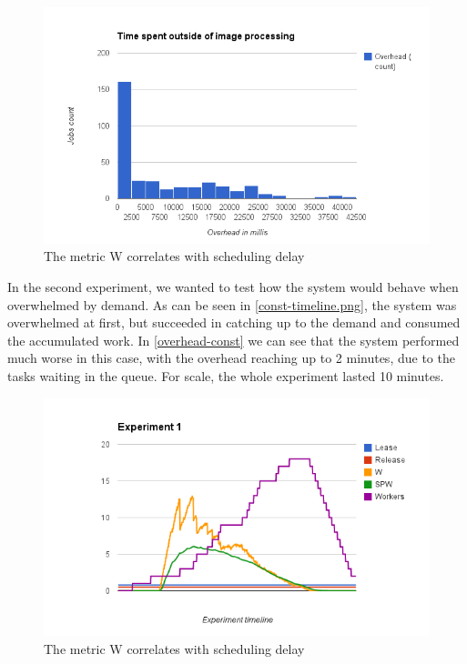 \documentclass{stylesheet}
\begin{document}
\begin{figure}[b!]
	\centering
	\includegraphics[width=\linewidth]{overhead-exp2.png}
	\caption{The metric W correlates with scheduling delay}
	\label{fig:scheduling-W}
\end{figure}

In the second experiment, we wanted to test how the system would behave when overwhelmed by demand. As can be seen in \cref{const-timeline.png}, the system was overwhelmed at first, but succeeded in catching up to the demand and consumed the accumulated work. In \cref{overhead-const} we can see that the system performed much worse in this case, with the overhead reaching up to 2 minutes, due to the tasks waiting in the queue. For scale, the whole experiment lasted 10 minutes. 

\begin{figure}[b!]
	\centering
	\includegraphics[width=\linewidth]{const-timeline.png}
	\caption{The metric W correlates with scheduling delay}
	\label{fig:scheduling-W}
\end{figure}
\end{document}
